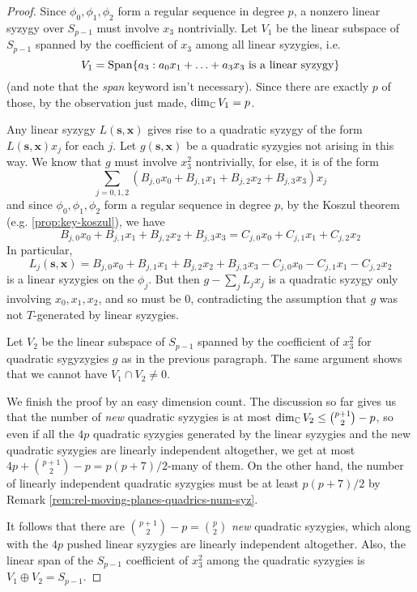 \documentclass[fleqn,reqno]{amsart}
\begin{document}
\begin{proof}
	Since $\phi_0,\phi_1,\phi_2$ form a regular sequence in degree $p$,
	a nonzero linear syzygy over $S_{p-1}$ must involve $x_3$ nontrivially.
	Let $V_1$ be the linear subspace of $S_{p-1}$ spanned by the
	coefficient of $x_3$ among all linear syzygies, i.e.
	\[
		V_1=\operatorname{Span}\{a_3:a_0x_1+\ldots+a_3x_3 \text{ is a linear syzygy}\}
	\]
	(and note that the {\em span} keyword isn't necessary).
	Since there are exactly $p$ of those, by the observation just made, $\dim_{\mathbb{C}} V_1=p$.
	
	Any linear syzygy $L(\mathbf s, \mathbf x)$ gives rise to a quadratic syzygy of the form
	$L(\mathbf s, \mathbf x)x_j$ for each $j$.
	Let $g(\mathbf s,\mathbf x)$ be a quadratic syzygies not arising in this way.
	We know that $g$ must involve $x_3^2$ nontrivially,
	for else, it is of the form
	\[
		\sum_{j=0,1,2} (B_{j,0}x_0+B_{j,1}x_1+B_{j,2}x_2+B_{j,3}x_3) x_j
	\]
	and since $\phi_0,\phi_1,\phi_2$ form a regular sequence in degree $p$,
	by the Koszul theorem (e.g. \ref{prop:key-koszul}),
	we have
	\[
		B_{j,0}x_0+B_{j,1}x_1+B_{j,2}x_2+B_{j,3}x_3=C_{j,0}x_0+C_{j,1}x_1+C_{j,2}x_2
	\]
	In particular,
	\[
		L_j(\mathbf s,\mathbf x)=B_{j,0}x_0+B_{j,1}x_1+B_{j,2}x_2+B_{j,3}x_3-C_{j,0}x_0-C_{j,1}x_1-C_{j,2}x_2
	\]
	is a linear syzygies on the $\phi_j$.
	But then $g-\sum_j L_jx_j$ is a quadratic syzygy only involving $x_0,x_1,x_2$,
	and so must be $0$, contradicting the assumption that $g$ was not $T$-generated by linear syzygies.
	
	Let $V_2$ be the linear subspace of $S_{p-1}$ spanned by the coefficient of $x_3^2$ for quadratic
	sygyzygies $g$ as in the previous paragraph. The same argument shows that we cannot have $V_1\cap V_2\neq0$.
	
	We finish the proof by an easy dimension count.
	The discussion so far gives us that the number of {\em new} quadratic syzygies is at most
	$\dim_{\mathbb{C}} V_2\leq\binom{p+1}{2}-p$,
	so even if all the $4p$ quadratic syzygies generated by the linear syzygies
	and the new quadratic syzygies are linearly independent altogether,
	we get at most $4p+\binom{p+1}{2}-p=p(p+7)/2$-many of them.
	On the other hand,
	the number of linearly independent quadratic syzygies must be at least $p(p+7)/2$
	by Remark \ref{rem:rel-moving-planes-quadrics-num-syz}.
	
	It follows that there are $\binom{p+1}{2}-p=\binom{p}{2}$ {\em new} quadratic syzygies,
	which along with the $4p$ pushed linear syzygies are linearly independent altogether.
	Also, the linear span of the $S_{p-1}$ coefficient of $x_3^2$ among the quadratic syzygies
	is $V_1\oplus V_2=S_{p-1}$.
\end{proof}
\end{document}

